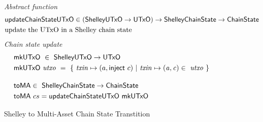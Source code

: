 \begin{figure}[htb]
  \emph{Abstract function}
  \begin{align*}
      & \mathsf{updateChainStateUTxO} \in (\mathsf{ShelleyUTxO} \to \mathsf{UTxO}) \to \mathsf{ShelleyChainState} \to \mathsf{ChainState} \\
      & \text{update the UTxO in a Shelley chain state}
  \end{align*}
  \emph{Chain state update}
  \begin{align*}
      & \fun{mkUTxO} ~\in~ \ShelleyUTxO  \to \UTxO  \\
      & \fun{mkUTxO}~\var{utxo} ~=~ \{~ \var{txin} \mapsto (a,\fun{inject}~c) ~\vert~
      \var{txin} \mapsto \var{(a,c)}\in ~\var{utxo}~\}
      \nextdef
      & \fun{toMA} \in ~ \ShelleyChainState \to \ChainState \\
      & \fun{toMA}~cs = \fun{updateChainStateUTxO}~\fun{mkUTxO}
  \end{align*}
  \caption{Shelley to Multi-Asset Chain State Transtition}
  \label{fig:functions:to-ma}
\end{figure}
